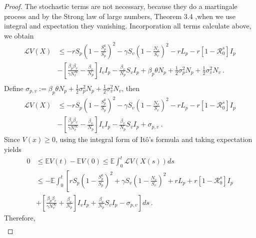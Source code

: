 \begin{proof}
	The stochastic terms are not necessary, because they do a martingale process
	and by the Strong law of large numbers, Theorem 3.4 
	\cite[see][pp. 12]{Mao2008},when we use integral and expectation they
	vanishing. Incorporation all terms calculate above, we obtain
	\begin{align*}
	 	\mathcal{L}V(X) 
			&\leq
				-r S_p
				\left(
					1 -\frac{S_p^0}{S_p}
				\right) ^ 2 - 
				\gamma S_v
				\left(
					1 - 
					\frac{N_v}{S_v}
				\right) ^ 2 - 
				r L_p - r 
				\left[
					1 - \mathcal{R}^s_0
				\right] I_p
			\\
			&-
				\left[
					\frac{\beta_p \beta_v}{\gamma N ^ \infty_v} - 
					\frac{\beta_v}{N_p}
				\right] I_v I_p - 
				\frac{\beta_v}{N_p} S_v I_p + 
				\beta_p \theta N_p + 
				\frac{1}{2} 
				\sigma_p ^ 2 N_p + 
				\frac{1}{2}
				\sigma_v^2 N_v\ .
			\\
	\end{align*}
	Define 
	$
		\sigma_{p,v}:= 
			\beta_p \theta N_p + 
			\frac{1}{2} 
			\sigma_p ^ 2 N_p +  
			\frac{1}{2} \sigma_v ^ 2 N_v
	$, then
	\begin{align*}
		\mathcal{L}V(X) 
			&\leq
				-r S_p
				\left(
					1 - 
					\frac{S_p^0}{S_p}
				\right) ^ 2 - 
				\gamma S_v
				\left( 1 -
					\frac{N_v}{S_v}
				\right) ^ 2 - r L_p - r 
				\left[
					1 - \mathcal{R}^s_0
				\right] I_p
			\\
			&-
				\left[
					\frac{\beta_p\beta_v}{\gamma N^\infty_v} - 
					\frac{\beta_v}{N_p}
				\right] I_v I_p - 
				\frac{\beta_v}{N_p} S_v I_p + 
				\sigma_{p,v} \ .
	\end{align*}
	Since $V(x)\geq 0$, using the integral form of It\^{o}'s formula and 
	taking expectation yields
	\begin{align*}
		0 
		&\leq
			\mathbb{E}V(t) - 
			\mathbb{E} V(0)
			\leq
			\mathbb{E}
			\int_{0} ^ {t}
				\mathcal{L} V(X(s)) ds
			\\
		&\leq
			-\mathbb{E}
			\int_{0} ^ {t}
			\left[
				rS_p 
				\left(
					1 - \frac{S_p^0}{S_p}
				\right)^2 + 
				\gamma S_v
				\left(1 - 
					\frac{N_v}{S_v}
				\right) ^ 2 + 
				r L_p + 
				r 
				\left[
					1 - \mathcal{R} ^ s _ 0
				\right] I_p 
			\right.
		\\
		&+
			\left.
				\left[
					\frac{\beta_p\beta_v}{\gamma N^\infty_v} + 
					\frac{\beta_v}{N_p}
				\right] I_v I_p + 
				\frac{\beta_v}{N_p} S_v I_p - 
				\sigma_{p,v}
			\right] ds \ .
	\end{align*}
%
	Therefore,
%	
	\begin{align*}

\end{align*}
\end{proof}
